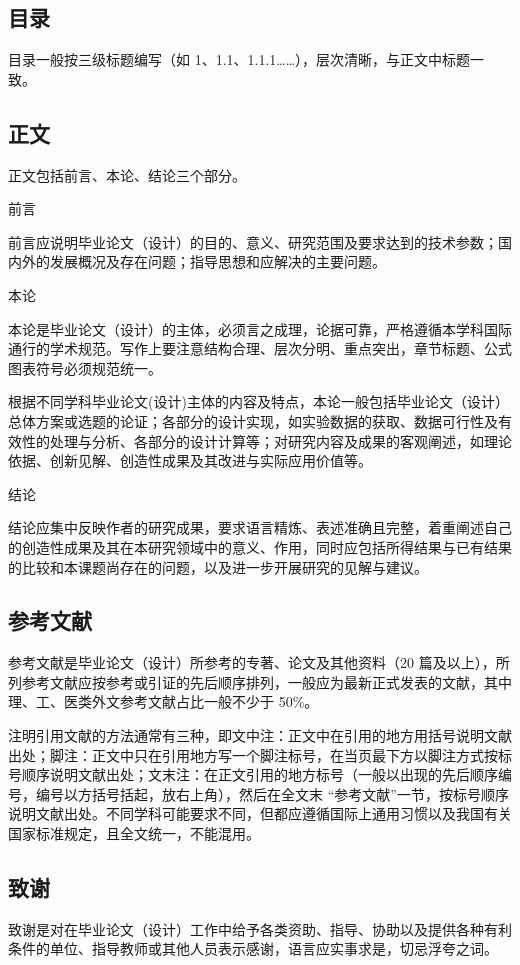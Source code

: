 \subsection{目录}
目录一般按三级标题编写（如 1、1.1、1.1.1……），层次清晰，与正文中标题一致。
\subsection{正文}
正文包括前言、本论、结论三个部分。
\begin{compactenum}
\item 前言

前言应说明毕业论文（设计）的目的、意义、研究范围及要求达到的技术参数；国内外的发展概况及存在问题；指导思想和应解决的主要问题。
\item 本论

本论是毕业论文（设计）的主体，必须言之成理，论据可靠，严格遵循本学科国际通行的学术规范。写作上要注意结构合理、层次分明、重点突出，章节标题、公式图表符号必须规范统一。

根据不同学科毕业论文(设计)主体的内容及特点，本论一般包括毕业论文（设计）总体方案或选题的论证；各部分的设计实现，如实验数据的获取、数据可行性及有效性的处理与分析、各部分的设计计算等；对研究内容及成果的客观阐述，如理论依据、创新见解、创造性成果及其改进与实际应用价值等。
\item 结论

结论应集中反映作者的研究成果，要求语言精炼、表述准确且完整，着重阐述自己的创造性成果及其在本研究领域中的意义、作用，同时应包括所得结果与已有结果的比较和本课题尚存在的问题，以及进一步开展研究的见解与建议。
\end{compactenum}
\subsection{参考文献}
参考文献是毕业论文（设计）所参考的专著、论文及其他资料（20 篇及以上），所列参考文献应按参考或引证的先后顺序排列，一般应为最新正式发表的文献，其中理、工、医类外文参考文献占比一般不少于 50\%。

注明引用文献的方法通常有三种，即文中注：正文中在引用的地方用括号说明文献出处；脚注：正文中只在引用地方写一个脚注标号，在当页最下方以脚注方式按标号顺序说明文献出处；文末注：在正文引用的地方标号（一般以出现的先后顺序编号，编号以方括号括起，放右上角），然后在全文末 “参考文献”一节，按标号顺序说明文献出处。不同学科可能要求不同，但都应遵循国际上通用习惯以及我国有关国家标准规定，且全文统一，不能混用。
\subsection{致谢}
致谢是对在毕业论文（设计）工作中给予各类资助、指导、协助以及提供各种有利条件的单位、指导教师或其他人员表示感谢，语言应实事求是，切忌浮夸之词。
